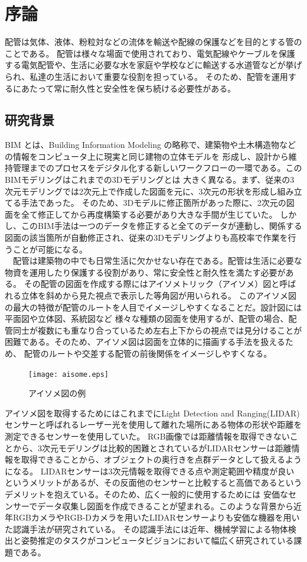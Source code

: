 \chapter{%
序論}

配管は気体、液体、粉粒対などの流体を輸送や配線の保護などを目的とする管のことである。
配管は様々な場面で使用されており、電気配線やケーブルを保護する電気配管や、生活に必要な水を家庭や学校などに輸送する水道管などが挙げられ、私達の生活において重要な役割を担っている。
そのため、配管を運用するにあたって常に耐久性と安全性を保ち続ける必要性がある。 \\

\section{研究背景}
BIM とは、Building Information Modeling の略称で、建築物や土木構造物などの情報をコンピュータ上に現実と同じ建物の立体モデルを
形成し、設計から維持管理までのプロセスをデジタル化する新しいワークフローの一環である。このBIMモデリングはこれまでの3Dモデリングとは
大きく異なる。まず、従来の3次元モデリングでは2次元上で作成した図面を元に、3次元の形状を形成し組み立てる手法であった。
そのため、3Dモデルに修正箇所があった際に、2次元の図面を全て修正してから再度構築する必要があり大きな手間が生じていた。
しかし、このBIM手法は一つのデータを修正すると全てのデータが連動し、関係する図面の該当箇所が自動修正され、従来の3Dモデリングよりも高校率で作業を行うことが可能になる。\\
　配管は建築物の中でも日常生活に欠かせない存在である。配管は生活に必要な物資を運用したり保護する役割があり、常に安全性と耐久性を満たす必要がある。
その配管の図面を作成する際にはアイソメトリック（アイソメ）図と呼ばれる立体を斜めから見た視点で表示した等角図が用いられる。
このアイソメ図の最大の特徴が配管のルートを人目でイメージしやすくなることだ。設計図には平面図や立体図、系統図など
様々な種類の図面を使用するが、配管の場合、配管同士が複数にも重なり合っているため左右上下からの視点では見分けることが困難である。そのため、アイソメ図は図面を立体的に描画する手法を扱えるため、
配管のルートや交差する配管の前後関係をイメージしやすくなる。\\
\begin{figure}[htbt]
	\centering
	 \texttt{[image: aisome.eps]}
	 \caption{アイソメ図の例}
	 \label{fig:f1}
\end{figure}

アイソメ図を取得するためにはこれまでにLight Detection and Ranging(LIDAR)センサーと呼ばれるレーザー光を使用して離れた場所にある物体の形状や距離を測定できるセンサーを使用していた。
RGB画像では距離情報を取得できないことから、3次元モデリングは比較的困難とされているがLIDARセンサーは距離情報を取得できることから、オブジェクトの奥行きを点群データとして扱えるようになる。
LIDARセンサーは3次元情報を取得できる点や測定範囲や精度が良いというメリットがあるが、その反面他のセンサーと比較すると高価であるというデメリットを抱えている。そのため、広く一般的に使用するためには
安価なセンサーでデータ収集し図面を作成できることが望まれる。このような背景から近年RGBカメラやRGB-Dカメラを用いたLIDARセンサーよりも安価な機器を用いた認識手法が研究されている。
その認識手法には近年、機械学習による物体検出と姿勢推定のタスクがコンピュータビジョンにおいて幅広く研究されている課題である。

